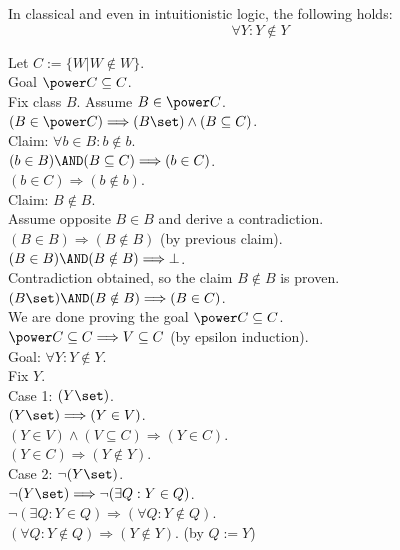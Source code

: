 \begin{theorem}
\label{thm:not in itself}
In classical and even in intuitionistic logic, the following holds:
\[ \forall Y: Y\notin Y\]
\end{theorem}
\Proof
\noindent %
Let $C:=\{W|W\notin W\}$.\\
Goal $\power C\subseteq C$.\\
Fix class $B$. Assume $B\in \power C$.\\
$(B\in \power C) \Longrightarrow (B\set)\land(B\subseteq C)$.\\
Claim: $\forall b\in B:b\notin b$.\\ %
$(b\in B)\AND(B\subseteq C) \Longrightarrow (b\in C)$.\\
$(b\in C) \Longrightarrow (b\notin b)$.\\
Claim: $B\notin B$.\\
Assume opposite $B\in B$ and derive a contradiction.\\
$(B\in B) \Longrightarrow (B\notin B)$ (by previous claim).\\
$(B\in B)\AND(B\notin B) \Longrightarrow \bot$.\\
Contradiction obtained, so the claim  $B\notin B$ is proven.\\
$(B\set)\AND(B\notin B) \Longrightarrow (B\in C)$.\\
We are done proving the goal $\power C\subseteq C$.\\
$\power C\subseteq C \Longrightarrow V\subseteq C$ (by epsilon induction).\\
Goal: $ \forall Y: Y\notin Y$.\\
Fix $Y$.\\
Case 1: $(Y\set)$.\\
$(Y\set)\Longrightarrow (Y\in V)$.\\
$(Y\in V)\land (V\subseteq C) \Longrightarrow (Y\in C)$.\\
$(Y\in C)\Longrightarrow (Y\notin Y)$.\\
Case 2: $\neg(Y\set)$.\\
$\neg(Y\set) \Longrightarrow \neg(\exists Q:Y\in Q)$.\\
$\neg(\exists Q:Y\in Q)  \Longrightarrow (\forall Q:Y\notin Q)$.\\
$(\forall Q:Y\notin Q) \Longrightarrow (Y\notin Y)$. (by $Q:=Y$)\\
\Done

